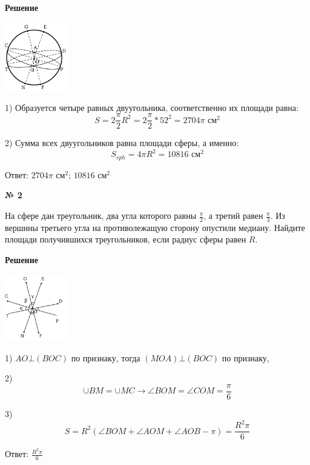      \textbf{Решение}\\

    \begin{center}
        \includegraphics[width=0.2\textwidth]{images/img1}\\
    \end{center}

    1) Образуется четыре равных двуугольника, соответственно их площади равна:
    \[
        S = 2\frac{\pi}{2}R^2 = 2 \frac{\pi}{2} * 52^2 = 2704\pi \text{ см}^2
    \]

    2) Сумма всех двуугольников равна площади сферы, а именно:
    \[
        S_{sph} = 4\pi R^2   =10816 \text{ см}^2
    \]

    Ответ: $2704\pi \text{ см}^2$;  $10816 \text{ см}^2$

    \begin{center}
        \textbf{№ 2}
    \end{center}

    На сфере дан треугольник, два угла которого равны $\frac{\pi}{2}$, а третий равен $\frac{\pi}{3}$.
    Из вершины третьего угла на противолежащую сторону опустили медиану.
    Найдите площади получившихся треугольников, если радиус сферы равен $R$.

    \textbf{Решение}\\

    \begin{center}
        \includegraphics[width=0.2\textwidth]{images/img2}\\
    \end{center}

    1) $AO \bot (BOC)$ по признаку, тогда $(MOA)\bot(BOC)$ по признаку,

    2) \[
           \cup BM = \cup MC \rightarrow \angle BOM = \angle COM = \frac{\pi}{6}
    \]

    3)
    \[
        S = R^2(\angle BOM + \angle AOM + \angle AOB - \pi) = \frac{R^2\pi}{6}
    \]

    Ответ: $\frac{R^2\pi}{6}$


